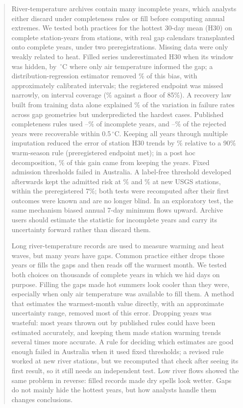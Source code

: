 \documentclass[draft]{agujournal2025}
\begin{document}
\begin{abstract}
River-temperature archives contain many incomplete years, which analysts either discard under completeness rules or fill before computing annual extremes. We tested both practices for the hottest 30-day mean (H30) on \TSourceYears{} complete station-years from \TSourceStations{} stations, with real gap calendars transplanted onto complete years, under two preregistrations. Missing data were only weakly related to heat. Filled series underestimated H30 when its window was hidden, by \TPOneBiasPZeroAbs\,$^{\circ}$C where only air temperature informed the gap; a distribution-regression estimator removed \TPOneReductionCal\% of this bias, with approximately calibrated intervals; the registered endpoint was missed narrowly, on interval coverage (\TPOneCoverageRone\% against a floor of 85\%). A recovery law built from training data alone explained \TLawCellFailEV\% of the variation in failure rates across gap geometries but underpredicted the hardest cases. Published completeness rules used \TRetainMin--\TRetainMax\% of incomplete years, and \TRejectedUsableMin--\TRejectedUsableMax\% of the rejected years were recoverable within 0.5\,$^{\circ}$C. Keeping all years through multiple imputation reduced the error of station H30 trends by \TTrendReduction\% relative to a 90\% warm-season rule (preregistered endpoint met); in a post hoc decomposition, \TShareKeep\% of this gain came from keeping the years. Fixed admission thresholds failed in Australia. A label-free threshold developed afterwards kept the admitted risk at \TNewRiskDeploy\% and \TNewRiskMech\% at \TNewStations{} new USGS stations, within the preregistered 7\%; both tests were recomputed after their first outcomes were known and are no longer blind. In an exploratory test, the same mechanism biased annual 7-day minimum flows upward. Archive users should estimate the statistic for incomplete years and carry its uncertainty forward rather than discard them.
\begin{plainlanguagesummary}
Long river-temperature records are used to measure warming and heat waves, but many years have gaps. Common practice either drops those years or fills the gaps and then reads off the warmest month. We tested both choices on thousands of complete years in which we hid days on purpose. Filling the gaps made hot summers look cooler than they were, especially when only air temperature was available to fill them. A method that estimates the warmest-month value directly, with an approximate uncertainty range, removed most of this error. Dropping years was wasteful: most years thrown out by published rules could have been estimated accurately, and keeping them made station warming trends several times more accurate. A rule for deciding which estimates are good enough failed in Australia when it used fixed thresholds; a revised rule worked at new river stations, but we recomputed that check after seeing its first result, so it still needs an independent test. Low river flows showed the same problem in reverse: filled records made dry spells look wetter. Gaps do not mainly hide the hottest years, but how analysts handle them changes conclusions.
\end{plainlanguagesummary}
\end{abstract}
\end{document}
